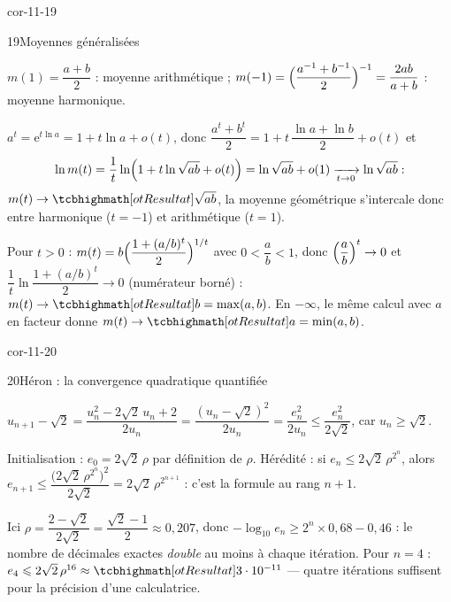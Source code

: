 \begin{blocLivre}{cor-11-19}
\begin{corrige}{19}{Moyennes généralisées}
\begin{questions}
  \item $m(1)=\dfrac{a+b}{2}$ : moyenne arithmétique ;
    $m(-1)=\Bigl(\dfrac{a^{-1}+b^{-1}}{2}\Bigr)^{-1}=\dfrac{2ab}{a+b}$ :
    moyenne harmonique.
  \item $a^{t}=\mathrm{e}^{t\ln a}=1+t\ln a+o(t)$, donc
    $\dfrac{a^{t}+b^{t}}{2}=1+t\,\dfrac{\ln a+\ln b}{2}+o(t)$ et
    \[
    \ln m(t)=\frac1t\ln\Bigl(1+t\ln\sqrt{ab}+o(t)\Bigr)
    =\ln\sqrt{ab}+o(1)\xrightarrow[t\to0]{}\ln\sqrt{ab} :
    \]
    $m(t)\to\res{\sqrt{ab}}$, la moyenne géométrique s'intercale donc entre
    harmonique ($t=-1$) et arithmétique ($t=1$).
  \item Pour $t>0$ : $m(t)=b\Bigl(\dfrac{1+(a/b)^{t}}{2}\Bigr)^{1/t}$ avec
    $0<\dfrac{a}{b}<1$, donc $\Bigl(\dfrac{a}{b}\Bigr)^{t}\to0$ et
    $\dfrac1t\ln\dfrac{1+(a/b)^{t}}{2}\to0$ (numérateur borné) :
    $m(t)\to\res{b=\max(a,b)}$. En $-\infty$, le même calcul avec $a$ en
    facteur donne $m(t)\to\res{a=\min(a,b)}$.
\end{questions}
\end{corrige}
\end{blocLivre}

\begin{blocLivre}{cor-11-20}
\begin{corrige}{20}{Héron : la convergence quadratique quantifiée}
\begin{questions}
  \item $u_{n+1}-\sqrt2=\dfrac{u_n^{2}-2\sqrt2\,u_n+2}{2u_n}
    =\dfrac{(u_n-\sqrt2)^{2}}{2u_n}=\dfrac{e_n^{2}}{2u_n}
    \leqslant\dfrac{e_n^{2}}{2\sqrt2}$, car $u_n\geqslant\sqrt2$.
  \item Initialisation : $e_0=2\sqrt2\,\rho$ par définition de $\rho$.
    Hérédité : si $e_n\leqslant2\sqrt2\,\rho^{2^{n}}$, alors
    $e_{n+1}\leqslant\dfrac{\bigl(2\sqrt2\,\rho^{2^{n}}\bigr)^{2}}{2\sqrt2}
    =2\sqrt2\,\rho^{2^{n+1}}$ : c'est la formule au rang $n+1$.
  \item Ici $\rho=\dfrac{2-\sqrt2}{2\sqrt2}=\dfrac{\sqrt2-1}{2}\approx0{,}207$,
    donc $-\log_{10}e_n\geqslant2^{n}\times0{,}68-0{,}46$ : le nombre de
    décimales exactes \emph{double} au moins à chaque itération. Pour $n=4$ :
    $e_4\leqslant2\sqrt2\,\rho^{16}\approx\res{3\cdot10^{-11}}$ — quatre
    itérations suffisent pour la précision d'une calculatrice.
\end{questions}
\end{corrige}
\end{blocLivre}

